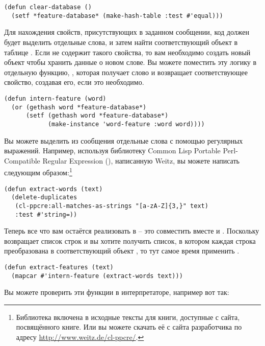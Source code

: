 \begin{lstlisting}
(defun clear-database ()
  (setf *feature-database* (make-hash-table :test #'equal)))
\end{lstlisting}

Для нахождения свойств, присутствующих в заданном сообщении, код должен будет выделить
отдельные слова, и затем найти соответствующий объект  в таблице
.  Если  не содержит такого свойства, то вам
необходимо создать новый объект  чтобы хранить данные о новом слове.  Вы
можете поместить эту логику в отдельную функцию, , которая получает
слово и возвращает соответствующее свойство, создавая его, если это необходимо.

\begin{lstlisting}
(defun intern-feature (word)
  (or (gethash word *feature-database*)
      (setf (gethash word *feature-database*)
            (make-instance 'word-feature :word word))))
\end{lstlisting}

Вы можете выделить из сообщения отдельные слова с помощью регулярных выражений.  Например,
используя библиотеку Common Lisp Portable Perl-Compatible Regular Expression
(), написанную Weitz, вы можете написать  следующим
образом:\footnote{Библиотека  включена в исходные тексты для книги,
  доступные с сайта, посвящённого книге.  Или вы можете скачать её с сайта разработчика по
  адресу \url{http://www.weitz.de/cl-ppcre/}.}

\begin{lstlisting}
(defun extract-words (text)
  (delete-duplicates
   (cl-ppcre:all-matches-as-strings "[a-zA-Z]{3,}" text)
   :test #'string=))
\end{lstlisting}

Теперь все что вам остаётся реализовать в  -- это совместить вместе
 и .  Поскольку  возвращает
список строк и вы хотите получить список, в котором каждая строка преобразована в
соответствующий объект , то тут самое время применить .

\begin{lstlisting}
(defun extract-features (text)
  (mapcar #'intern-feature (extract-words text)))
\end{lstlisting}

Вы можете проверить эти функции в интерпретаторе, например вот так:

